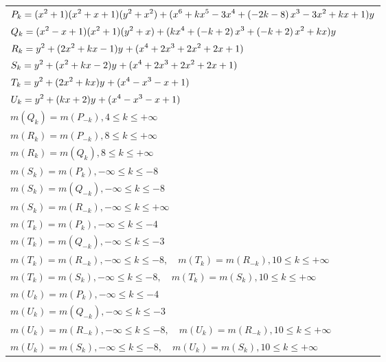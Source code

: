 \documentclass{amsart}
\begin{document}
\begin{longtable}{|l|}
\hline
\(\displaystyle P_k=(x^2
 + 1)(x^2
 + x
 + 1)(y^2+x^2)+(x^6
 + k\*x^5
 - 3\*x^4
 + \left(-2\*k
 - 8\right) \*x^3
 - 3\*x^2
 + k\*x
 + 1)y\)\\
\(\displaystyle Q_k=(x^2
 - x
 + 1)(x^2
 + 1)(y^2+x)+(k\*x^4
 + \left(-k
 + 2\right) \*x^3
 + \left(-k
 + 2\right) \*x^2
 + k\*x)y\)\\
\(\displaystyle R_k=y^{2}+(2\*x^2
 + k\*x
 - 1)y^{}+(x^4
 + 2\*x^3
 + 2\*x^2
 + 2\*x
 + 1)\)\\
\(\displaystyle S_k=y^{2}+(x^2
 + k\*x
 - 2)y^{}+(x^4
 + 2\*x^3
 + 2\*x^2
 + 2\*x
 + 1)\)\\
\(\displaystyle T_k=y^{2}+(2\*x^2
 + k\*x)y^{}+(x^4
 - x^3
 - x
 + 1)\)\\
\(\displaystyle U_k=y^{2}+(k\*x
 + 2)y^{}+(x^4
 - x^3
 - x
 + 1)\)\\
\(\displaystyle m(Q_k) = m(P_{-k}),4 \leqslant k \leqslant +\infty\)\\
\(\displaystyle m(R_k) = m(P_{-k}),8 \leqslant k \leqslant +\infty\)\\
\(\displaystyle m(R_k) = m(Q_{k}),8 \leqslant k \leqslant +\infty\)\\
\(\displaystyle m(S_k) = m(P_{k}),-\infty \leqslant k \leqslant -8\)\\
\(\displaystyle m(S_k) = m(Q_{-k}),-\infty \leqslant k \leqslant -8\)\\
\(\displaystyle m(S_k) = m(R_{-k}),-\infty \leqslant k \leqslant +\infty\)\\
\(\displaystyle m(T_k) = m(P_{k}),-\infty \leqslant k \leqslant -4\)\\
\(\displaystyle m(T_k) = m(Q_{-k}),-\infty \leqslant k \leqslant -3\)\\
\(\displaystyle m(T_k) = m(R_{-k}),-\infty \leqslant k \leqslant -8,\quad m(T_k) = m(R_{-k}),10 \leqslant k \leqslant +\infty\)\\
\(\displaystyle m(T_k) = m(S_{k}),-\infty \leqslant k \leqslant -8,\quad m(T_k) = m(S_{k}),10 \leqslant k \leqslant +\infty\)\\
\(\displaystyle m(U_k) = m(P_{k}),-\infty \leqslant k \leqslant -4\)\\
\(\displaystyle m(U_k) = m(Q_{-k}),-\infty \leqslant k \leqslant -3\)\\
\(\displaystyle m(U_k) = m(R_{-k}),-\infty \leqslant k \leqslant -8,\quad m(U_k) = m(R_{-k}),10 \leqslant k \leqslant +\infty\)\\
\(\displaystyle m(U_k) = m(S_{k}),-\infty \leqslant k \leqslant -8,\quad m(U_k) = m(S_{k}),10 \leqslant k \leqslant +\infty\)\\

\end{longtable}
\end{document}
